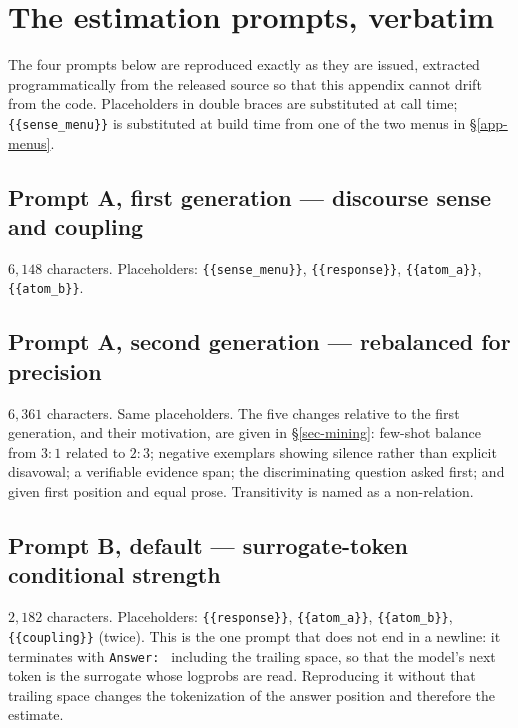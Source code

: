\section{The estimation prompts, verbatim}
\label{app-prompts}

The four prompts below are reproduced exactly as they are issued, extracted programmatically from the
released source so that this appendix cannot drift from the code. Placeholders in double braces are
substituted at call time; \verb|{{sense_menu}}| is substituted at build time from one of the two menus
in \S\ref{app-menus}.

\subsection{Prompt A, first generation --- discourse sense and coupling}
\label{app-prompt-a1}
$6{,}148$ characters. Placeholders: \verb|{{sense_menu}}|, \verb|{{response}}|, \verb|{{atom_a}}|,
\verb|{{atom_b}}|.

\subsection{Prompt A, second generation --- rebalanced for precision}
\label{app-prompt-a2}
$6{,}361$ characters. Same placeholders. The five changes relative to the first generation, and their
motivation, are given in \S\ref{sec-mining}: few-shot balance from $3{:}1$ related to $2{:}3$; negative
exemplars showing silence rather than explicit disavowal; a verifiable evidence span; the
discriminating question asked first; and  given first position and equal prose.
Transitivity is named as a non-relation.

\subsection{Prompt B, default --- surrogate-token conditional strength}
\label{app-prompt-b1}
$2{,}182$ characters. Placeholders: \verb|{{response}}|, \verb|{{atom_a}}|, \verb|{{atom_b}}|,
\verb|{{coupling}}| (twice). This is the one prompt that does not end in a newline: it terminates with
\verb|Answer: | including the trailing space, so that the model's next token is the surrogate whose
logprobs are read. Reproducing it without that trailing space changes the tokenization of the answer
position and therefore the estimate.

